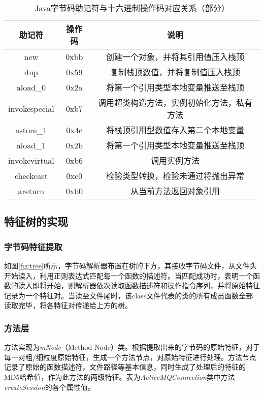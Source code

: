 \begin{table}[!hpt]
  \caption{Java字节码助记符与十六进制操作码对应关系（部分）}
  \label{tab:bytecode}
  \centering
  \begin{tabular}{ccc} \toprule
    助记符 & 操作码 & 说明 \\ \midrule
    new  & 0xbb & 创建一个对象，并将其引用值压入栈顶 \\
	dup & 0x59 & 复制栈顶数值，并将复制值压入栈顶 \\
	aload\_0 & 0x2a & 将第一个引用类型本地变量推送至栈顶 \\
	invokespecial & 0xb7 & 调用超类构造方法，实例初始化方法，私有方法 \\
	astore\_1 & 0x4c & 将栈顶引用型数值存入第二个本地变量 \\
	aload\_1 & 0x2b & 将第一个引用类型本地变量推送至栈顶 \\
	invokevirtual & 0xb6 & 调用实例方法 \\
	checkcast & 0xc0 & 检验类型转换，检验未通过将抛出异常 \\
	areturn & 0xb0 & 从当前方法返回对象引用 \\ \bottomrule
  \end{tabular}
\end{table}




\subsection{特征树的实现}

\subsubsection{字节码特征提取}

如图\ref{fig:tree}所示，字节码解析器布置在树的下方，其接收字节码文件，从文件头开始读入，利用正则表达式匹配每一个函数的描述符。当匹配成功时，表明一个函数的读入即将开始，则解析器依次读取函数描述符和操作指令序列，并将原始特征记录为一个特征对。当读至文件尾时，该class文件代表的类的所有成员函数全部读取完毕，将各特征对传递给上方的树。


\subsubsection{方法层}

方法实现为\textit{mNode}（Method Node）类。根据提取出来的字节码的原始特征，对于每一对粗/细粒度原始特征，生成一个方法节点，对原始特征进行处理。方法节点记录了原始的函数描述符，文件路径等基本信息，同时生成了处理后的特征的MD5哈希值，作为此方法的两级特征。表为\textit{ActiveMQConnection}类中方法\textit{createSession}的各个属性值。

